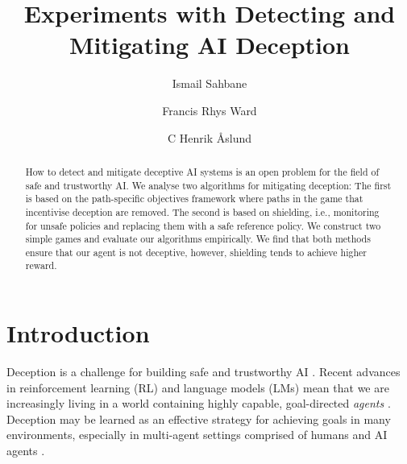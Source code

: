 \documentclass[submission,publicdomain,creativecommons noncommercial]{eptcs}
\title{Experiments with Detecting and Mitigating AI Deception} %
\author{Ismail Sahbane%
\institute{EPFL \\ Lausanne, Switzerland}
\email{ismail.sahbane@epfl.ch}
\and
Francis Rhys Ward
\institute{Imperial College London \\ London, UK}
\email{francis.ward19@imperial.ac.uk}
\and
C Henrik Åslund
\institute{Imperial College London \\ London, UK}
\email{c.aslund19@imperial.ac.uk}
}
\begin{document}
\maketitle

\begin{abstract}
How to detect and mitigate deceptive AI systems is an open problem for the field of safe and trustworthy AI. We analyse two algorithms for mitigating deception:
The first is based on the path-specific objectives framework where paths in the game that incentivise deception are removed. 
The second is based on shielding, i.e., monitoring for unsafe policies and replacing them with a safe reference policy.
We construct two simple games and evaluate our algorithms empirically.
We find that both methods ensure that our agent is not deceptive, however, shielding tends to achieve higher reward.

\end{abstract}

\section{Introduction}

Deception is a challenge for building safe and trustworthy AI \cite{me}. Recent advances in reinforcement learning (RL) and language models (LMs) mean that we are increasingly living in a world containing highly capable, goal-directed \emph{agents} \cite{gpt4technicalreport2023}. Deception may be learned as an effective strategy for achieving goals in many environments, especially in multi-agent settings comprised of humans and AI agents \cite{me}. 
\end{document}
